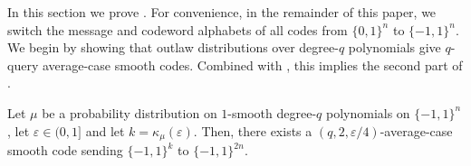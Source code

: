 \documentclass{toc}
\newcommand{\bset}[1]{\{0,1\}^{#1}} %
\newcommand{\pmset}[1]{\{-1,1\}^{#1}} %
\newcommand{\sBC}{{\{-1,1\}}}
\newcommand{\eps}{\varepsilon}
\begin{document}
In this section we prove .
For convenience, in the remainder of this paper, we switch the message and codeword alphabets of all codes from $\bset{n}$ to $\pmset{n}$.
We begin by showing that outlaw distributions over degree-$q$ polynomials give $q$-query average-case smooth codes.
Combined with , this implies the second part of .


\begin{theorem}
\label{thm:degq_dist2avg}
Let $\mu$ be a probability distribution on $1$-smooth degree-$q$ polynomials on $\sBC^n$, let $\eps \in (0,1]$ and let $k = \kappa_\mu(\eps)$. 
Then, there exists a $(q,2,\eps/4)$-average-case smooth code sending $\sBC^k$ to $\pmset{2n}$.
\end{theorem}
\end{document}
